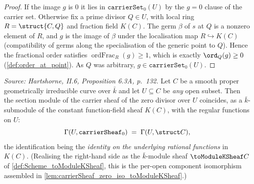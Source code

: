 \begin{proof}
  If the image \(g\) is \(0\) it lies in \(\texttt{carrierSet}_0(U)\) by the
  \(g = 0\) clause of the carrier set. Otherwise fix a prime divisor
  \(Q \in U\), with local ring \(R = \struct{C,Q}\) and fraction field
  \(K(C)\). The germ \(\beta\) of \(s\) at \(Q\) is a nonzero element of \(R\),
  and \(g\) is the image of \(\beta\) under the localisation map
  \(R \hookrightarrow K(C)\) (compatibility of germs along the specialisation
  of the generic point to \(Q\)). Hence the fractional order satisfies
  \(\operatorname{ordFrac}_R(g) \ge 1\), which is exactly \(\ord_Q(g) \ge 0\)
  (\cref{def:order_at_point}). As \(Q\) was arbitrary,
  \(g \in \texttt{carrierSet}_0(U)\).
\end{proof}

\begin{lemma}
  \label{lem:carrierSheaf_zero_sections_eq_structureSheaf}
  \textit{Source: Hartshorne, II.6, Proposition 6.3A, p.~132.}
  Let \(C\) be a smooth proper geometrically irreducible curve over \(\bar k\)
  and let \(U \subseteq C\) be \emph{any} open subset. Then the section module
  of the carrier sheaf of the zero divisor over \(U\) coincides, as a
  \(\bar k\)-submodule of the constant function-field sheaf \(K(C)\), with the
  regular functions on \(U\):
  \[
    \Gamma(U, \texttt{carrierSheaf}_0) \;=\; \Gamma(U, \struct C),
  \]
  the identification being the \emph{identity on the underlying rational
  functions} in \(K(C)\). (Realising the right-hand side as the \(\bar k\)-module
  sheaf \(\toModuleKSheaf C\) of \cref{def:Scheme_toModuleKSheaf}, this is the
  per-open component isomorphism assembled in
  \cref{lem:carrierSheaf_zero_iso_toModuleKSheaf}.)
\end{lemma}

